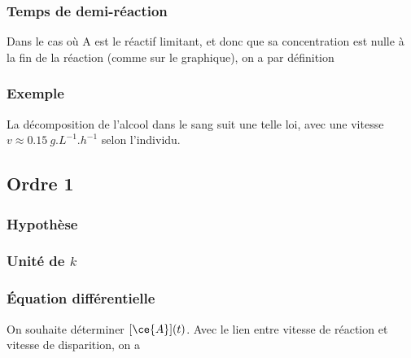 \documentclass[../../main/main.tex]{subfiles}
\begin{document}
\subsubsection{Temps de demi-réaction}
Dans le cas où A est le réactif limitant, et donc que sa concentration est nulle
à la fin de la réaction (comme sur le graphique), on a par définition

\subsubsection{Exemple}
La décomposition de l'alcool dans le sang suit une telle loi, avec une vitesse
$v \approx \SI{0.15}{g.L^{-1}.h^{-1}}$ selon l'individu.

\subsection{Ordre 1}

\subsubsection{Hypothèse}
\smallbreak
{}

\subsubsection{Unité de $k$}


\subsubsection{Équation différentielle}
On souhaite déterminer $[{\ce{A}}](t)$. Avec le lien entre vitesse de réaction et
vitesse de disparition, on a
\end{document}
